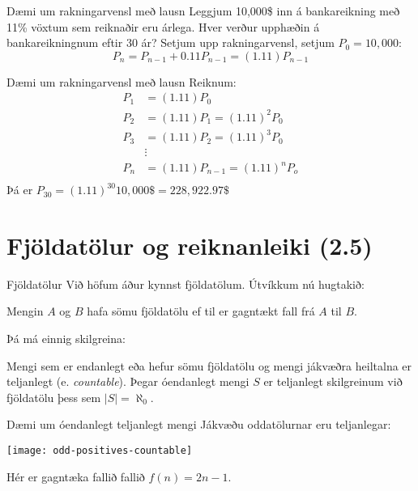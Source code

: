 \documentclass[handout]{beamer}
\begin{document}
\begin{frame}{Dæmi um rakningarvensl með lausn}
    Leggjum 10,000\$ inn á bankareikning með 11\% vöxtum sem reiknaðir eru árlega. Hver verður upphæðin á bankareikningnum eftir 30 ár?
    \pause
    Setjum upp rakningarvensl, setjum $P_0 = 10,000$:
    \[
        P_n = P_{n-1} + 0.11P_{n-1} = (1.11)P_{n-1}
    \]
\end{frame}

\begin{frame}{Dæmi um rakningarvensl með lausn}
    Reiknum:
    \begin{align*}
        P_1 &= (1.11)P_0\\
        P_2 &= (1.11)P_1 = (1.11)^2P_0\\
        P_3 &= (1.11)P_2 = (1.11)^3P_0\\
        &\vdots\\
        P_n &= (1.11)P_{n-1} = (1.11)^nP_o\\
    \end{align*}
    Þá er $P_{30} = (1.11)^{30}10,000\$ = 228,922.97\$ $
\end{frame}

\section{Fjöldatölur og reiknanleiki (2.5)}

\begin{frame}{Fjöldatölur}
Við höfum áður kynnst fjöldatölum. Útvíkkum nú hugtakið:

\begin{tcolorbox}[title=Eins fjöldatölur]
Mengin $A$ og $B$ hafa sömu fjöldatölu ef til er gagntækt fall frá $A$ til $B$.
\end{tcolorbox}

\pause Þá má einnig skilgreina:

\begin{tcolorbox}[title=Teljanleiki]
Mengi sem er endanlegt eða hefur sömu fjöldatölu og mengi jákvæðra heiltalna er teljanlegt (e. \emph{countable}). Þegar óendanlegt mengi $S$ er teljanlegt skilgreinum við fjöldatölu þess sem $|S| = \aleph_0$.
\end{tcolorbox}
\end{frame}

\begin{frame}{Dæmi um óendanlegt teljanlegt mengi}
    Jákvæðu oddatölurnar eru teljanlegar:
    
    \texttt{[image: odd-positives-countable]}
    
    Hér er gagntæka fallið fallið $f(n) = 2n-1$.
\end{frame}
\end{document}
